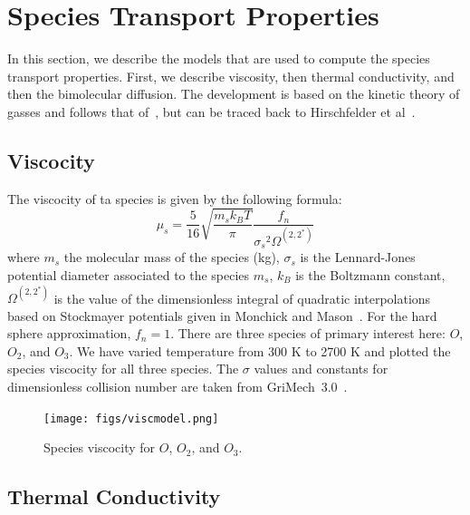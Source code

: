 \section{Species Transport Properties}\label{sec:species-trans}

In this section, we describe the models that are used to compute the
species transport properties. First, we describe viscosity, then
thermal conductivity, and then the bimolecular diffusion. The
development is based on the kinetic theory of gasses and follows that of~\cite{Kee}, but can be traced back to
Hirschfelder et al~\cite{Curtiss}.

\subsection{Viscocity}
The viscocity of ta species is given by the following formula:
\begin{equation}
\mu_s = \frac{5}{16}\sqrt{\frac{m_s k_B T}{\pi}}\frac{f_n}{{\sigma_s}^2   \Omega^{(2,2^*)}}
\end{equation}
%
where $m_s$ the molecular mass of the species (kg), $\sigma_s$ is the
Lennard-Jones potential diameter associated to the species $m_s$,
$k_B$ is the Boltzmann constant, $\Omega^{(2,2^*)}$ is the value of
the dimensionless  integral of  quadratic
interpolations based on Stockmayer potentials given in
Monchick and Mason~\cite{Monchick}. For the hard sphere approximation,
$f_n = 1$.  There are three species of primary interest here: $O$,
$O_2$, and $O_3$. We have varied temperature from 300 K to 2700 K and
plotted the species viscocity for all three species. The $\sigma$
values and constants for dimensionless collision number are taken from
GriMech~3.0~\cite{gri}.
\begin{figure}[H]
  \centering
  \texttt{[image: figs/viscmodel.png]}
   \caption{Species viscocity for $O$, $O_2$, and $O_3$.}
\end{figure}


\subsection{Thermal Conductivity}

